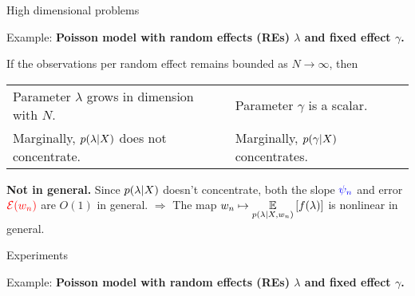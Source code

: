 \begin{frame}{High dimensional problems}


Example: \textbf{Poisson model with random effects (REs)
$\lambda$ and fixed effect $\gamma$.}

If the observations per random effect remains bounded as $N \rightarrow
\infty$, then

\begin{tabular}{ll}
    Parameter $\lambda$ grows in dimension with $N$.& 
    Parameter $\gamma$ is a scalar. \\
    Marginally, $p(\lambda \vert X)$ does not concentrate. &
    Marginally, $p(\gamma \vert X)$ concentrates. \\
\end{tabular}

\pause
{}

\textbf{Not in general. }
Since $p(\lambda \vert X)$ doesn't concentrate, both the slope $\textcolor{blue}{\psi_n}$ and
error $\textcolor{red}{\mathcal{E}(w_n)}$ are $O(1)$ in general.
%
$\Rightarrow$ The map
$w_n \mapsto \underset{p(\lambda \vert X, w_n)}{\mathbb{E}}\left[f(\lambda)\right]$ is nonlinear in general.

\pause
\spskip
{}
%

\pause

%
\end{frame}



\begin{frame}{Experiments}

Example: \textbf{Poisson model with random effects (REs)
$\lambda$ and fixed effect $\gamma$.}

\HighDimAccuracyGraph{}

\end{frame}
